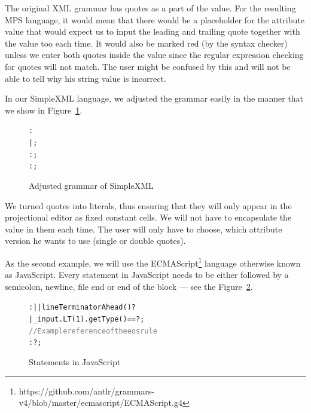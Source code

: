 The original XML grammar has quotes as a part of the value.
For the resulting MPS language, it would mean that there would be a placeholder for the attribute value that would expect us to input the leading and trailing quote together with the value too each time.
It would also be marked red (by the syntax checker) unless we enter both quotes inside the value since the regular expression checking for quotes will not match.
The user might be confused by this and will not be able to tell why his string value is incorrect.

In our SimpleXML language, we adjusted the grammar easily in the manner that we show in Figure~\ref{fig:xmladjustgrammar}.

\begin{figure}[ht]
\centering
\begin{framed}
\begin{alltt}
	 :    
	       |     ;
	 : \antlrregex{~["]*} ;
	 : \antlrregex{~[']*} ;
\end{alltt}
\end{framed}
\caption{Adjusted grammar of SimpleXML}
\label{fig:xmladjustgrammar}
\end{figure}

We turned quotes into literals, thus ensuring that they will only appear in the projectional editor as fixed constant cells.
We will not have to encapsulate the value in them each time.
The user will only have to choose, which attribute version he wants to use (single or double quotes).

As the second example, we will use the ECMAScript\footnote{https://github.com/antlr/grammars-v4/blob/master/ecmascript/ECMAScript.g4} language otherwise known as JavaScript.
Every statement in JavaScript needs to be either followed by a semicolon, newline, file end or end of the block --- see the Figure~\ref{fig:javascriptstmt}.

\begin{figure}[ht]
\centering
\begin{framed}
\begin{alltt}
	 :  |  | {lineTerminatorAhead()}? 
	    | {{\_}input.LT(1).getType() == }? ;
	\textcolor{gray}{// Example reference of the eos rule}
	 :  ?  ;
\end{alltt}
\end{framed}
\caption{Statements in JavaScript}
\label{fig:javascriptstmt}
\end{figure}

